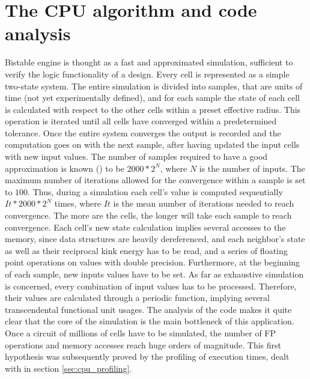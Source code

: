 \section{The CPU algorithm and code analysis}\label{sec:cpu_algorithm}
Bistable engine is thought as a fast and approximated simulation, sufficient to verify the logic functionality of a design. 
Every cell is represented as a simple two-state system. The entire simulation is divided into samples, that are units of time 
(not yet experimentally defined), and for each sample the state of each cell is calculated with respect to the other cells within 
a preset effective radius. This operation is iterated until all cells have converged within a predetermined tolerance. 
Once the entire system converges the output is recorded and the computation goes on with the next sample, after having updated
 the input cells with new input values.
The number of samples required to have a good approximation is known (\cite{site:MinaBistable}) to be $2000*2^N$, where $N$ is the number of inputs.
 The maximum number of iterations allowed for the convergence within a sample is set to $100$. Thus, during a simulation each cell's value 
is computed sequentially $It*2000*2^N$ times, where $It$ is the mean number of iterations needed to reach convergence. 
The more are the cells, the longer will take each sample to reach convergence. Each cell's new state calculation implies several accesses to the memory, since data structures are heavily dereferenced, and each neighbor's state as well as their reciprocal kink energy has to be read, and a series of floating point operations on values with double precision. Furthermore, at the beginning of each sample, new inputs values have to be set. As far as exhaustive simulation is concerned, every combination of input values has to be processed. Therefore, their values are calculated through a periodic function, implying several transcendental functional unit usages.\newline
The analysis of the code makes it quite clear that the core of the simulation is the main bottleneck of this application. Once a circuit of millions of cells have to be simulated, the number of FP operations and memory accesses reach huge orders of magnitude. This first hypothesis was subsequently proved by the profiling of execution times, dealt with in section \ref{sec:cpu_profiling}.


